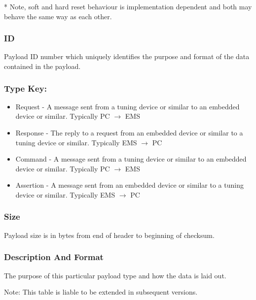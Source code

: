 \documentclass[12pt,a4paper,titlepage]{article}
\begin{document}
* Note, soft and hard reset behaviour is implementation
dependent and both may behave the same way as each other.
\normalsize


\subsubsection*{ID}
Payload ID number which uniquely identifies the purpose and format of the data
contained in the payload.

\subsubsection*{Type Key:}
\begin{itemize}
\item Request - A message sent from a tuning device or similar to an embedded
device or similar. Typically PC $\rightarrow$ EMS
\item Response - The reply to a request from an embedded device or similar to a
tuning device or similar. Typically EMS $\rightarrow$ PC
\item Command - A message sent from a tuning device or similar to an embedded
device or similar. Typically PC $\rightarrow$ EMS
\item Assertion - A message sent from an embedded device or similar to a tuning
device or similar. Typically EMS $\rightarrow$ PC
\end{itemize}

\subsubsection*{Size}
Payload size is in bytes from end of header to beginning of checksum.

\subsubsection*{Description And Format}
The purpose of this particular payload type and how the data is laid out.

Note: This table is liable to be extended in subsequent
versions.
\end{document}
